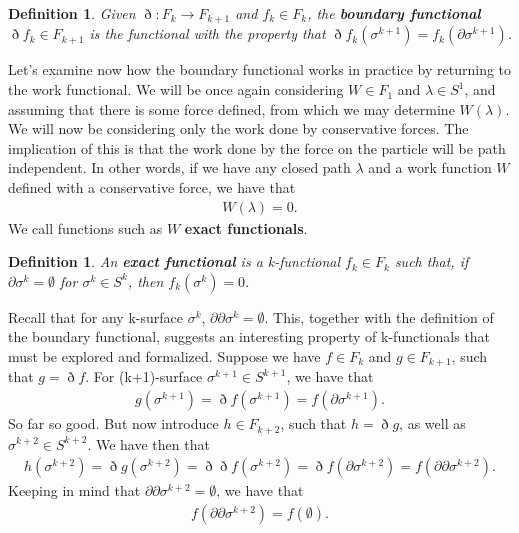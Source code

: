 \documentclass{book}
\newtheorem{defn}[equation]{Definition}
\begin{document}
\begin{defn}
	Given $\eth : F_k \to F_{k+1}$ and $f_k \in F_k$, the \textbf{boundary functional} $\eth f_k \in F_{k+1}$ is the functional with the property that $\eth f_k(\sigma^{k+1}) = f_k(\partial \sigma^{k+1})$. 
\end{defn}


Let's examine now how the boundary functional works in practice by returning to the work functional. We will be once again considering $W \in F_1$ and $\lambda \in S^1$, and assuming that there is some force defined, from which we may determine $W(\lambda)$. We will now be considering only the work done by conservative forces. The implication of this is that the work done by the force on the particle will be path independent. In other words, if we have any closed path $\lambda$ and a work function $W$ defined with a conservative force, we have that \begin{gather} W(\lambda) = 0. \end{gather} We call functions such as $W$ \textbf{exact functionals}.   


\begin{defn}
	An \textbf{exact functional} is a k-functional $f_k \in F_k$ such that, if $\partial\sigma^k = \emptyset$ for $\sigma^k \in S^k$, then $f_k(\sigma^k) = 0$. 
\end{defn}


Recall that for any k-surface $\sigma^k$, $\partial\partial\sigma^k = \emptyset$. This, together with the definition of the boundary functional, suggests an interesting property of k-functionals that must be explored and formalized. Suppose we have $f \in F_k$ and $g \in F_{k+1}$, such that $g = \eth f$. For (k+1)-surface $\sigma^{k+1} \in S^{k+1}$, we have that \begin{gather} g(\sigma^{k+1}) = \eth f(\sigma^{k+1}) = f(\partial\sigma^{k+1}). \end{gather} So far so good. But now introduce $h \in F_{k+2}$, such that $h = \eth g$, as well as $\sigma^{k+2} \in S^{k+2}$. We have then that \begin{gather} h(\sigma^{k+2}) = \eth g(\sigma^{k+2}) = \eth\eth f(\sigma^{k+2}) = \eth f(\partial\sigma^{k+2}) = f(\partial\partial\sigma^{k+2}). \end{gather} Keeping in mind that $\partial\partial\sigma^{k+2} = \emptyset$, we have that \begin{gather}f(\partial\partial\sigma^{k+2}) = f(\emptyset). \end{gather}
\end{document}
